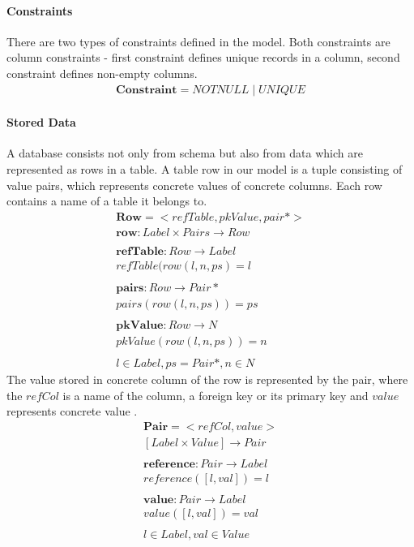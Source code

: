 \documentclass[11pt]{article}
\begin{document}
\paragraph{Constraints} There are two types of constraints defined in the model. Both constraints are column constraints - first constraint defines unique records in a column, second constraint defines non-empty columns.
\begin{align*}
	\mathbf{Constraint} = NOTNULL \; | \; UNIQUE 
\end{align*}


\paragraph{Stored Data} A database consists not only from schema but also from data which are represented as rows in a table. A table row in our model is a tuple consisting of value pairs, which represents concrete values of concrete columns. Each row contains a name of a table it belongs to.
\begin{align*}
	\mathbf{Row} = < refTable, pkValue, pair* > \\
	\mathbf{row} : Label \times Pairs \rightarrow Row \\ \\
	\mathbf{refTable} : Row \rightarrow Label \\
	refTable(row(l, n, ps) = l \\ \\
	\mathbf{pairs} : Row \rightarrow Pair* \\
	pairs(row(l, n, ps)) = ps \\ \\
	\mathbf{pkValue} : Row \rightarrow N \\
	pkValue(row(l, n, ps)) = n \\ \\
	 l \in Label, ps = Pair*, n \in N
\end{align*}
The value stored in concrete column of the row is represented by the pair, where the $refCol$ is a name of the column, a foreign key or its primary key and $value$ represents concrete value .
\begin{align*}
	\mathbf{Pair} = < refCol, value > \\
	[Label \times Value] \rightarrow Pair\\ \\
	\mathbf{reference} : Pair \rightarrow Label \\
	reference([l,val]) = l \\ \\
	\mathbf{value} : Pair \rightarrow Label \\ 
	value([l,val]) = val \\ \\
	l \in Label, val \in Value
\end{align*}
\end{document}
